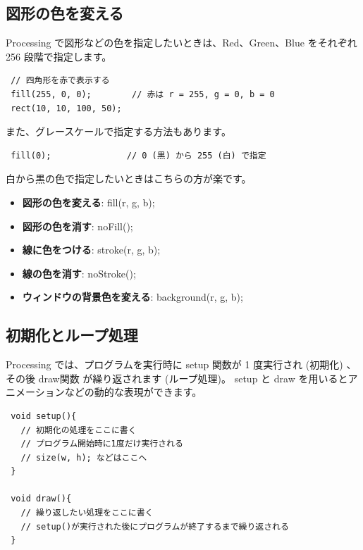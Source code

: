 \documentclass[11pt,a4paper]{jarticle}
\begin{document}
\subsection*{図形の色を変える}
Processing で図形などの色を指定したいときは、Red、Green、Blue をそれぞれ 256 段階で指定します。
\begin{lstlisting}
 // 四角形を赤で表示する
 fill(255, 0, 0);        // 赤は r = 255, g = 0, b = 0
 rect(10, 10, 100, 50);
\end{lstlisting}
また、グレースケールで指定する方法もあります。
\begin{lstlisting}
 fill(0);               // 0 (黒) から 255 (白) で指定
\end{lstlisting}
白から黒の色で指定したいときはこちらの方が楽です。

\begin{itemize}
 \item \textbf{図形の色を変える}: fill(r, g, b);
 \item \textbf{図形の色を消す}: noFill();
 \item \textbf{線に色をつける}: stroke(r, g, b);
 \item \textbf{線の色を消す}: noStroke();
 \item \textbf{ウィンドウの背景色を変える}: background(r, g, b);
\end{itemize}


\subsection*{初期化とループ処理}
Processing では、プログラムを実行時に setup 関数が 1 度実行され (初期化) 、その後 draw関数 が繰り返されます (ループ処理)。
setup と draw を用いるとアニメーションなどの動的な表現ができます。

\begin{lstlisting}
 void setup(){
   // 初期化の処理をここに書く
   // プログラム開始時に1度だけ実行される
   // size(w, h); などはここへ
 }

 void draw(){
   // 繰り返したい処理をここに書く
   // setup()が実行された後にプログラムが終了するまで繰り返される
 }
\end{lstlisting}
\end{document}

